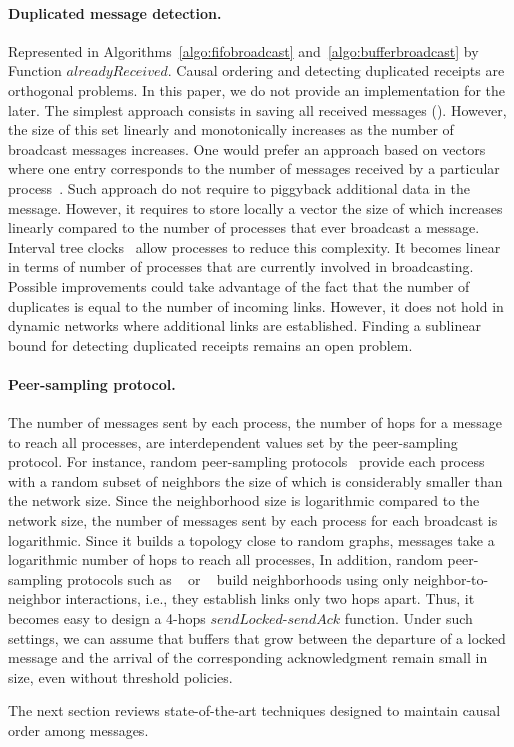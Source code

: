 \paragraph{Duplicated message detection.}  Represented in
Algorithms~\ref{algo:fifobroadcast} and~\ref{algo:bufferbroadcast} by Function
$alreadyReceived$. Causal ordering and detecting duplicated receipts are
orthogonal problems. In this paper, we do not provide an implementation for the
later. The simplest approach consists in saving all received messages
(\REF). However, the size of this set linearly and monotonically increases as
the number of broadcast messages increases. One would prefer an approach based
on vectors where one entry corresponds to the number of messages received by a
particular process~\cite{fidge1988timestamps}. Such approach do not require to
piggyback additional data in the message. However, it requires to store locally
a vector the size of which increases linearly compared to the number of
processes that ever broadcast a message. Interval tree
clocks~\cite{almeida2008interval} allow processes to reduce this complexity. It
becomes linear in terms of number of processes that are currently involved in
broadcasting. Possible improvements could take advantage of the fact that the
number of duplicates is equal to the number of incoming links. However, it does
not hold in dynamic networks where additional links are established. Finding a
sublinear bound for detecting duplicated receipts remains an open problem.


\paragraph{Peer-sampling protocol.} The number of messages sent by each process,
the number of hops for a message to reach all processes,  are
interdependent values set by the peer-sampling protocol. For instance, random
peer-sampling protocols~\cite{jelasity2007gossip} provide each process with a
random subset of neighbors the size of which is considerably smaller than the
network size. Since the neighborhood size is logarithmic compared to the network
size, the number of messages sent by each process for each broadcast is
logarithmic. Since it builds a topology close to random graphs, messages take a
logarithmic number of hops to reach all processes,   In addition,
random peer-sampling protocols such as \SPRAY~\cite{nedelec2017adaptive} or
\CYCLON~\cite{voulgaris2005cyclon} build neighborhoods using only
neighbor-to-neighbor interactions, i.e., they establish links only two hops
apart. Thus, it becomes easy to design a 4-hops $sendLocked$-$sendAck$
function. Under such settings, we can assume that buffers that grow between the
departure of a locked message and the arrival of the corresponding
acknowledgment remain small in size, even without threshold policies.

The next section reviews state-of-the-art techniques designed to maintain causal
order among messages.

